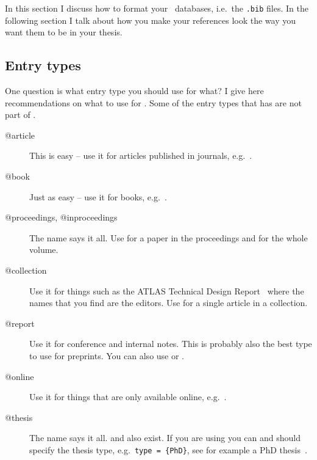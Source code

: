 In this section I discuss how to format your \BibTeX\ databases,
i.e.\ the \texttt{.bib} files. In the following section I talk about
how you make your references look the way you want them to be in your
thesis.

\subsection{Entry types}
\label{sec:ref:entry}

One question is what entry type you should use for what? I give here
recommendations on what to use for . Some of the entry
types that  has are not part of \BibTeX.

\begin{description}
\item[@article] This is easy -- use it for articles published in
  journals, e.g.~\cite{Abramowicz:2010ih}.
\item[@book] Just as easy -- use it for books, e.g.~\cite{kopka04}.
\item[@proceedings, @inproceedings] The name says it all. Use
   for a paper in the proceedings and
   for the whole volume.
\item[@collection] Use it for things such as the ATLAS Technical Design
  Report~\cite{lhc:vol1} where the names that you find are the
  editors. Use  for a single article in a
  collection.
\item[@report] Use it for conference and
  internal notes. This is
  probably also the best type to use for preprints. You can also use
   or .
\item[@online] Use it for things that are only available online,
  e.g.~\cite{lshort}.
\item[@thesis] The name says it all.
    and
  also exist. If you are using  you can and should specify
  the thesis type, e.g.\ \texttt{type = \{PhD\}}, see for example a
  PhD thesis~\cite{tlodd:2012}.
\end{description}

